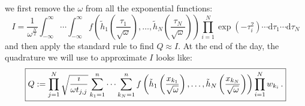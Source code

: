 \documentclass[a4paper,10pt]{article}
\begin{document}
we first remove the $\omega$ from all the exponential functions:
\begin{equation*}
 I = \frac{1}{\omega^\frac{N}{2}}
     \int_{-\infty}^\infty \cdots \int_{-\infty}^\infty
       f\left(\tilde{h}_1\left(\frac{\tau_1}{\sqrt{\omega}}\right),
              \ldots,
              \tilde{h}_N\left(\frac{\tau_N}{\sqrt{\omega}}\right)
       \right)
       \prod_{i=1}^N \exp\left(-\tau_i^2\right) \cdots
    \mathrm{d}\tau_1 \cdots \mathrm{d}\tau_N
\end{equation*}
and then apply the standard rule to find $Q \approx I$. At the end
of the day, the quadrature we will use to approximate $I$ looks like:
\begin{equation}\label{eq:final_quadrature}
\boxed{
  Q :=
  \prod_{j=1}^N \sqrt{\frac{\imath}{\omega t_{j,j}}}
  \sum_{k_1=1}^n \cdots \sum_{k_N=1}^n
    f\left(\tilde{h}_1\left(\frac{x_{k_1}}{\sqrt{\omega}}\right),
           \ldots,
           \tilde{h}_N\left(\frac{x_{k_N}}{\sqrt{\omega}}\right)
    \right)
    \prod_{i=1}^N w_{k_i} \,.
}
\end{equation}
\end{document}
